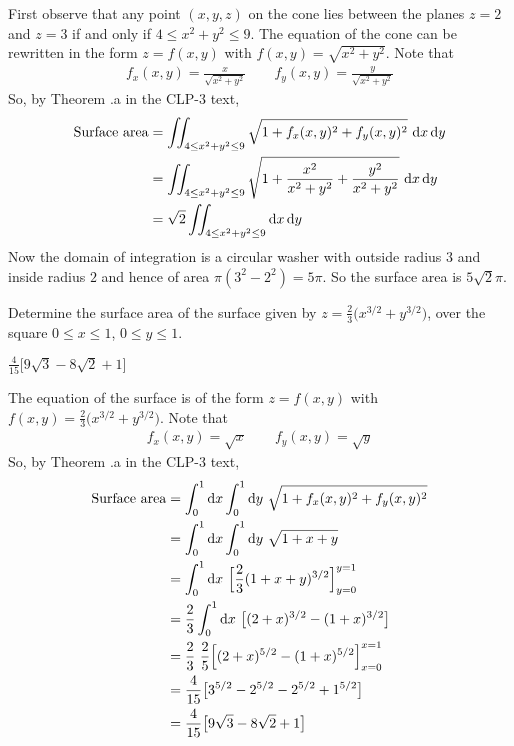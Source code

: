 \begin{solution}
First observe that any point $(x,y,z)$ on the cone lies between the 
planes $z=2$ and $z=3$ if and only if $4\le x^2+y^2\le 9$.
The equation of the cone can be rewritten in the form 
$z=f(x,y)$ with $f(x,y)=\sqrt{x^2+y^2}$. Note that
\begin{align*}
f_x(x,y)=\frac{x}{\sqrt{x^2+y^2}}\qquad
f_y(x,y)=\frac{y}{\sqrt{x^2+y^2}}
\end{align*}
So, by 
Theorem .a in the CLP-3 text,
\begin{align*}
\text{Surface area}
&= \dblInt_{4\le x^2+y^2\le 9}\sqrt{1+f_x(x,y)^2+f_y(x,y)^2}\ \dee{x}\,\dee{y} \\
&= \dblInt_{4\le x^2+y^2\le 9}
    \sqrt{1+\frac{x^2}{x^2+y^2}+\frac{y^2}{x^2+y^2}}\ \dee{x}\,\dee{y} \\
&=\sqrt{2} \dblInt_{4\le x^2+y^2\le 9} \dee{x}\,\dee{y} 
\end{align*}
Now the domain of integration is a circular washer with outside radius $3$
and inside radius $2$ and hence of area $\pi(3^2-2^2)=5\pi$. So the surface area is $5\sqrt{2}\pi$.

\end{solution}
\begin{question}[M253 2015D] %
Determine the surface area of the surface given by 
$z = \frac{2}{3}\big(x^{3/2} + y^{3/2}\big)$, over the square
$0 \le  x \le  1$, $0 \le  y \le  1$.
\end{question}


\begin{answer}
$\frac{4}{15}\big[9\sqrt{3}-8\sqrt{2}+1\big]$
\end{answer}

\begin{solution}
The equation of the surface is of the form 
$z=f(x,y)$ with $f(x,y)=\frac{2}{3}\big(x^{3/2} + y^{3/2}\big)$. Note that
\begin{align*}
f_x(x,y)=\sqrt{x}\qquad
f_y(x,y)=\sqrt{y}
\end{align*}
So, by Theorem .a in the CLP-3 text,
\begin{align*}
\text{Surface area}
&= \int_0^1\dee{x}\int_0^1\dee{y}\ \sqrt{1+f_x(x,y)^2+f_y(x,y)^2} \\
&= \int_0^1\dee{x}\int_0^1\dee{y}\ \sqrt{1+x+y} \\
&= \int_0^1\dee{x}\ \Big[\frac{2}{3}(1+x+y)^{3/2}\Big]_{y=0}^{y=1} \\
&= \frac{2}{3}\int_0^1\dee{x}\ \big[(2+x)^{3/2}-(1+x)^{3/2}\big] \\
&= \frac{2}{3}\ \frac{2}{5}\Big[(2+x)^{5/2}-(1+x)^{5/2}\Big]_{x=0}^{x=1} \\
&= \frac{4}{15} \big[3^{5/2}-2^{5/2}-2^{5/2}+1^{5/2}\big] \\
&= \frac{4}{15}\big[9\sqrt{3}-8\sqrt{2}+1\big]
\end{align*}
\end{solution}

